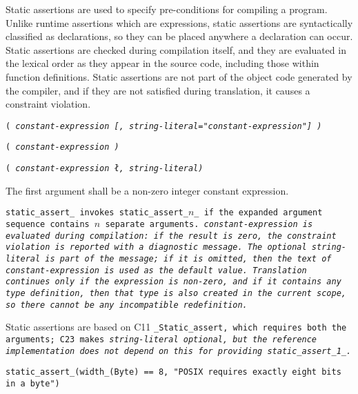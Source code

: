 Static assertions are used to specify pre-conditions for compiling a program.
Unlike runtime assertions which are expressions,
static assertions are syntactically classified as declarations,
so they can be placed anywhere a declaration can occur.
Static assertions are checked during compilation itself,
and they are evaluated in the lexical order as they appear in the source code,
including those within function definitions.
Static assertions are not part of the object code generated by the compiler,
and if they are not satisfied during translation,
it causes a constraint violation.


\s\s\s\tt{(}   \it{constant-expression}
[\tt{,} \it{string-literal}\tt{="}\it{constant-expression}\tt{"}] \tt{)}

\s\tt{(} \it{constant-expression} \tt{)}

\s\tt{(} \it{constant-expression}
\l\tt{,} \it{string-literal}\r \tt{)}


The first argument shall be a non-zero integer constant expression.


\tt{static_assert_} invokes \tt{static_assert_}$n$\_ if the
expanded argument sequence contains $n$ separate arguments.
\it{constant-expression} is evaluated during compilation: if the result is zero,
the constraint violation is reported with a diagnostic message.
The optional \it{string-literal} is part of the message; if it is omitted,
then the text of \it{constant-expression} is used as the default value.
Translation continues only if the expression is non-zero,
and if it contains any type definition,
then that type is also created in the current scope,
so there cannot be any incompatible redefinition.

\note Static assertions are based on C11 \tt{_Static_assert}, which requires
both the arguments; C23 makes \it{string-literal} optional, but the reference
implementation does not depend on this for providing \tt{static_assert_1_}.

\example \tt{static_assert_(width_(Byte) == 8,
"POSIX requires exactly eight bits in a byte")}
